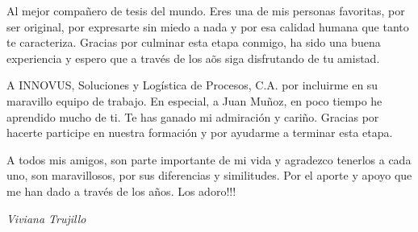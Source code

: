 Al mejor compa\~nero de tesis del mundo. Eres una de mis personas favoritas, por ser original, por expresarte sin miedo a nada y por esa calidad humana que tanto te caracteriza. Gracias por culminar esta etapa conmigo, ha sido una buena experiencia y espero que a trav\'es de los a\~os siga disfrutando de tu amistad.

A INNOVUS, Soluciones y Log\'istica de Procesos, C.A. por incluirme en su maravillo equipo de trabajo. En especial, a Juan Mu\~noz, en poco tiempo he aprendido mucho de ti. Te has ganado mi admiraci\'on y cari\~no. Gracias por hacerte participe en nuestra formaci\'on y por ayudarme a terminar esta etapa. 

A todos mis amigos, son parte importante de mi vida y agradezco tenerlos a cada uno, son maravillosos, por sus diferencias y similitudes. Por el aporte y apoyo que me han dado a trav\'es de los a\~nos. Los adoro!!!

\begin{flushright}
\textit{Viviana Trujillo}
\end{flushright}